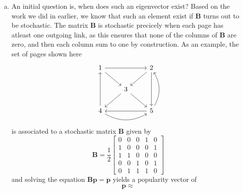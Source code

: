 \documentclass[12pt, oneside, article, a4paper]{memoir}
\newcommand{\mat}[1]{\bm{#1}}
\begin{document}
\begin{enumerate}[a)]

    \item An initial question is, when does such an eigenvector exist? Based on
        the work we did in earlier, we know that such an element exist if \(
        \mat{B} \) turns out to be stochastic. The matrix \( \mat{B} \) is
        stochastic precicely when each page has atleast one outgoing link, as
        this ensures that none of the columns of \( \mat{B} \) are zero, and
        then each column sum to one by construction. As an example, the
        set of pages shown here
        \begin{equation}
            \begin{tikzcd}
        1 \arrow[rr] \arrow[rd] &  & 2 \arrow[ld] \arrow[dd] \\
         & 3 \arrow[ld] \arrow[rd] &  \\
        4 \arrow[uu] \arrow[rr, bend right] &  & 5 \arrow[uu, bend right] \arrow[ll]
            \end{tikzcd}
        \end{equation}
        is associated to a stochastic matrix \( \mat{B} \) given by
        \begin{equation}
            \mat{B} = \frac{1}{2} \begin{bmatrix}
                0 & 0 & 0 & 1 & 0 \\
                1 & 0 & 0 & 0 & 1 \\
                1 & 1 & 0 & 0 & 0 \\
                0 & 0 & 1 & 0 & 1 \\
                0 & 1 & 1 & 1 & 0
            \end{bmatrix}
        \end{equation}
        and solving the equation \( \mat{Bp} = \mat{p} \) yields a popularity vector of
        \begin{equation}
            \mat{p} \approx
        \end{equation}


\end{enumerate}
\end{document}
